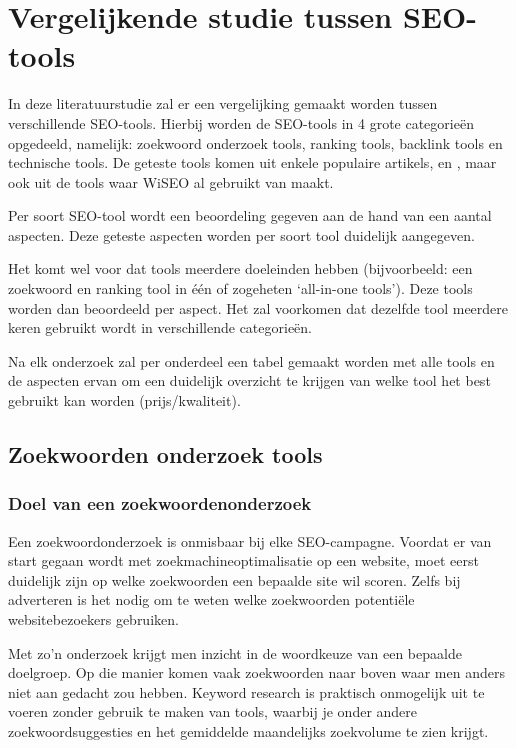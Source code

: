 \chapter{Vergelijkende studie tussen SEO-tools}
\label{ch:Vergelijkende studie tussen SEO-tools}

In deze literatuurstudie zal er een vergelijking gemaakt worden tussen verschillende SEO-tools. Hierbij worden de SEO-tools in 4 grote categorieën opgedeeld, namelijk: zoekwoord onderzoek tools, ranking tools, backlink tools en technische tools. De geteste tools komen uit enkele populaire artikels, \textcite{SEOCOMPLETE} en \textcite{SEO13}, maar ook uit de tools waar WiSEO al gebruikt van maakt. 

Per soort SEO-tool wordt een beoordeling gegeven aan de hand van een aantal aspecten. Deze geteste aspecten worden per soort tool duidelijk aangegeven. 

Het komt wel voor dat tools meerdere doeleinden hebben (bijvoorbeeld: een zoekwoord en ranking tool in één of zogeheten ‘all-in-one tools’). Deze tools worden dan beoordeeld per aspect. Het zal voorkomen dat dezelfde tool meerdere keren gebruikt wordt in verschillende categorieën. 

Na elk onderzoek zal per onderdeel een tabel gemaakt worden met alle tools en de aspecten ervan om een duidelijk overzicht te krijgen van welke tool het best gebruikt kan worden (prijs/kwaliteit). 

\section{Zoekwoorden onderzoek tools}
\label{ch: Zoekwoorden onderzoek tools}

\subsection{Doel van een zoekwoordenonderzoek}
\label{ch: Doel van een zoekwoorden onderzoek}

Een zoekwoordonderzoek is onmisbaar bij elke SEO-campagne. Voordat er van start gegaan wordt met zoekmachineoptimalisatie op een website, moet eerst duidelijk zijn op welke zoekwoorden een bepaalde site wil scoren. Zelfs bij adverteren is het nodig om te weten welke zoekwoorden potentiële websitebezoekers gebruiken. 

Met zo’n onderzoek krijgt men inzicht in de woordkeuze van een bepaalde doelgroep. Op die manier komen vaak zoekwoorden naar boven waar men anders niet aan gedacht zou hebben. Keyword research is praktisch onmogelijk uit te voeren zonder gebruik te maken van tools, waarbij je onder andere zoekwoordsuggesties en het gemiddelde maandelijks zoekvolume te zien krijgt. 

